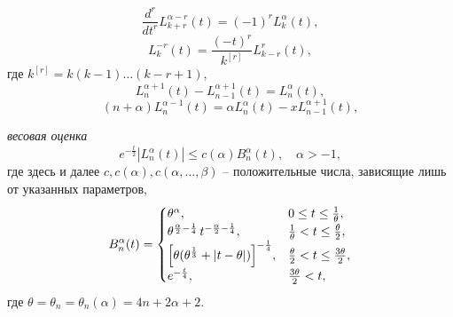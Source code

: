 \begin{equation} \label{2.8}
\frac{d^r}{dt^r} L_{k+r}^{\alpha-r}(t) = (-1)^{r} L_{k}^{\alpha}(t),
\end{equation}
\begin{equation}\label{2.9}
L_{k}^{-r}(t) = \frac{(-t)^{r}}{k^{[r]}} L_{k-r}^{r}(t),
\end{equation}
где $k^{[r]} = k(k-1)\ldots(k-r+1)$,
\begin{equation}\label{2.10}
L_n^{\alpha+1}(t)-L_{n-1}^{\alpha+1}(t)=L_n^\alpha(t),
     \end{equation}
 \begin{equation}\label{2.11}
(n+\alpha)L_n^{\alpha-1}(t)=\alpha L_n^\alpha(t)-
xL_{n-1}^{\alpha+1}(t),
\end{equation}







\textit{весовая оценка} \cite{AskeyWaiger}
\begin{equation}\label{2.12}
e^{-\frac{t}{2}}|L_n^\alpha(t)| \le c(\alpha) B_n^\alpha(t), \quad \alpha>-1,
\end{equation}
где здесь и далее $c,c(\alpha),c(\alpha,\ldots,\beta)$ -- положительные числа, зависящие лишь от указанных параметров,
\begin{equation*}
B_n^\alpha(t)=
\begin{cases}
\theta^\alpha, &0 \le t \le \frac{1}{\theta},\\
\theta^{\frac{\alpha}{2} - \frac{1}{4}}\,t^{-\frac{\alpha}{2} - \frac{1}{4}}, & \frac{1}{\theta} < t \le \frac{\theta}{2},\\
\Bigl[
\theta(\theta^{\frac{1}{3}}+|t-\theta|)
\Bigr]^{-\frac{1}{4}}, & \frac{\theta}{2} < t \le \frac{3\theta}{2},\\
e^{-\frac{t}{4}}, &\frac{3\theta}{2}< t,
\end{cases}
\end{equation*}
где $\theta=\theta_n=\theta_n(\alpha)=4n+2\alpha+2$.

